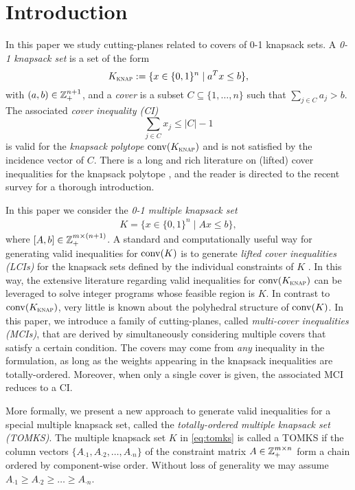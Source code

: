 \section{Introduction}
\label{sec:intro}

In this paper we study cutting-planes related to covers of 0-1 knapsack sets.  
A \emph{0-1 knapsack set} is a set of the form 
\[ K_{\mbox{\scriptsize \sc knap}} := \{x \in \{0,1\}^n \mid a^T x \leq b\}, \] 
with $(a, b) \in \mathbb{Z}^{n+1}_+$, and a \emph{cover} is a subset $C \subseteq \{1, \ldots, n\}$ such that $\sum_{j \in C} a_j > b$.  
The associated \emph{cover inequality (CI)}
\[ \sum_{j \in C} x_j \leq |C| - 1 \]
is valid for the \emph{knapsack polytope} $\operatorname{conv}(K_{\mbox{\scriptsize \sc knap}})$ and is not satisfied by the incidence vector of $C$.
There is a long and rich literature on (lifted) cover inequalities for the knapsack polytope
\cite{balas1975facets,hammer1975facet,wolsey1976facets,gu1998lifted,letchford2019lifted}, and the reader is directed to the recent survey \cite{hojny2019knapsack} for a thorough introduction.

In this paper we consider the \emph{0-1 multiple knapsack set}
\begin{align}
K = \{x \in \{0,1\}^n \mid Ax \leq b\}, \label{eq:tomks}
\end{align}
where $[A, b] \in \mathbb{Z}^{m \times (n+1)}_+$.
A standard and computationally useful way for generating  valid inequalities 
for $\operatorname{conv}(K)$
is to generate \emph{lifted cover inequalities (LCIs)} for the knapsack sets defined by the individual constraints of $K$
\cite{crowder1983solving}.  In this way, the extensive literature regarding valid inequalities for $\operatorname{conv}(K_{\mbox{\scriptsize \sc knap}})$ can be leveraged  to solve integer programs whose feasible region is $K$.
In contrast to $\operatorname{conv}(K_{\mbox{\scriptsize \sc knap}})$, very little is known about 
the polyhedral structure of $\operatorname{conv}(K)$.
In this paper, we introduce a family of cutting-planes, called \emph{multi-cover inequalities (MCIs)}, that are derived by simultaneously considering multiple covers that satisfy a certain condition.
The covers may come from \emph{any} inequality in the formulation, as long as the weights appearing in the knapsack inequalities are totally-ordered. Moreover, when only a single cover is given, the associated MCI reduces to a CI.  

More formally, we present a new approach to generate valid inequalities for a special multiple knapsack set, called the \emph{totally-ordered multiple knapsack set (TOMKS)}.
The multiple knapsack set $K$ in \eqref{eq:tomks} is called a TOMKS if the column vectors $\{A_{\cdot 1}, A_{\cdot 2}, \ldots , A_{\cdot n}\}$ of the constraint matrix $A \in \mathbb{Z}^{m \times n}_+$ form a chain ordered by component-wise order. Without loss of generality we may assume $A_{\cdot 1} \geq  A_{\cdot 2} \geq \ldots \geq A_{\cdot n}$.


